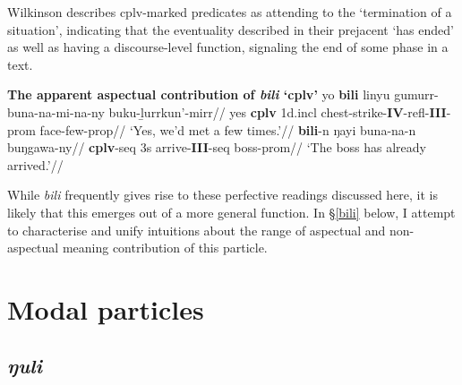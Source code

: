 Wilkinson describes \gls{cplv}-marked predicates as attending to the `termination of a situation', indicating that the eventuality described in their prejacent `has ended' as well as having a discourse-level function, signaling the end of some phase in a text.

\pex \textbf{The apparent aspectual contribution of \textit{bili} `\gls{cplv}'}
\a\begingl\gla yo \textbf{bili} linyu gumurr-buna-na-mi-na-ny buku-ḻurrkun'-mirr//
\glb yes \textbf{\gls{cplv}} 1d.\gls{incl} chest-strike-\textbf{IV}-\gls{refl}-\textbf{III}-\gls{prom} face-few-\gls{prop}//
\glft`Yes, we'd met a few times.'//\endgl
\a\begingl\gla \textbf{bili}-n ŋayi buna-na-n buŋgawa-ny//
\glb \textbf{\gls{cplv}}-\gls{seq} 3s arrive-\textbf{III}-\gls{seq} boss-\gls{prom}//
\glft`The boss has already arrived.'//\endgl\xe


While \textit{bili} frequently gives rise to these perfective readings discussed here, it is likely that this emerges out of a more general function. In §\ref{bili} below, I attempt to characterise and unify intuitions about the range of aspectual and non-aspectual meaning contribution of this particle.



\section{Modal particles}\label{modals}
\subsection*{\textit{ŋuli}}\label{ŋuli}

